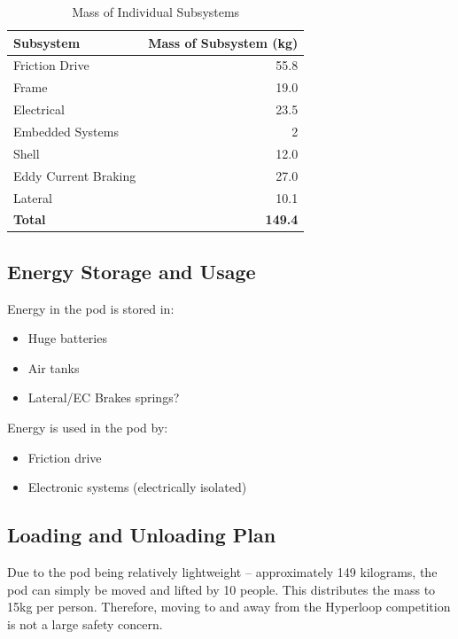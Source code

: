 \documentclass[main.tex]{subfiles}
\begin{document}
\begin{table}[H]
\centering
\begin{tabular}{@{}lr@{}} 
	\toprule Subsystem & Mass of Subsystem (\si{kg}) \\ \midrule
    Friction Drive & 55.8 \\
    Frame & 19.0 \\
    Electrical & 23.5 \\
    Embedded Systems & 2 \\
    Shell & 12.0 \\
    Eddy Current Braking & 27.0 \\
    Lateral & 10.1 \\ \midrule
    \textbf{Total} & \textbf{149.4}
\end{tabular}
  \caption{Mass of Individual Subsystems}
  \label{table:mass}
\end{table}


\subsection{Energy Storage and Usage}
Energy in the pod is stored in:
\begin{itemize}
    \item Huge batteries
    \item Air tanks
    \item Lateral/EC Brakes springs?
\end{itemize}
Energy is used in the pod by:
\begin{itemize}
    \item Friction drive
    \item Electronic systems (electrically isolated)
\end{itemize}


\subsection{Loading and Unloading Plan}
Due to the pod being relatively lightweight – approximately 149 kilograms, the pod can simply be moved and lifted by 10 people. This distributes the mass to 15kg per person. Therefore, moving to and away from the Hyperloop competition is not a large safety concern.
\end{document}
